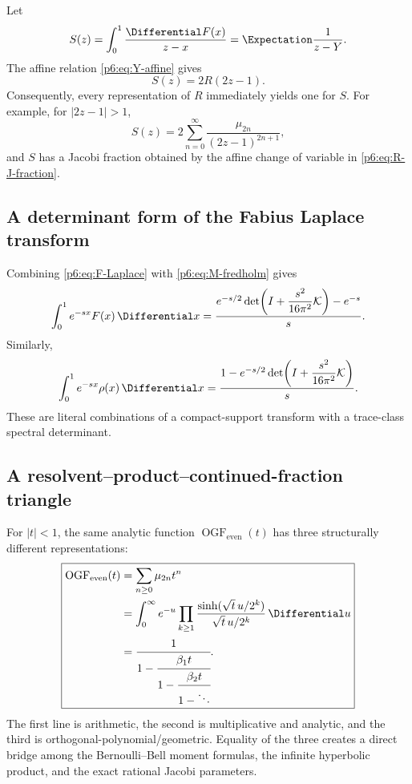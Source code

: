\documentclass[11pt]{article}
\theoremstyle{definition}
\theoremstyle{remark}
\newcommand{\cK}{\mathcal K}
\newcommand{\EvenMomentOrdinaryGeneratingFunction}{\operatorname{OGF}_{\mathrm{even}}}
\begin{document}
Let
\begin{equation}
 S(z)=\int_0^1\frac{\Differential F(x)}{z-x}=\Expectation\frac1{z-Y}.            \label{p6:eq:S-def}
\end{equation}
The affine relation \eqref{p6:eq:Y-affine} gives
\begin{equation}
 \boxed{S(z)=2R(2z-1).}                                     \label{p6:eq:S-R}
\end{equation}
Consequently, every representation of \(R\) immediately yields one for \(S\).  For example,
for \(|2z-1|>1\),
\begin{equation}
 S(z)=2\sum_{n=0}^{\infty}\frac{\mu_{2n}}{(2z-1)^{2n+1}},   \label{p6:eq:S-moment}
\end{equation}
and \(S\) has a Jacobi fraction obtained by the affine change of variable in
\eqref{p6:eq:R-J-fraction}.

\subsection{A determinant form of the Fabius Laplace transform}

Combining \eqref{p6:eq:F-Laplace} with \eqref{p6:eq:M-fredholm} gives
\begin{equation}
 \int_0^1e^{-sx}F(x)\,\Differential x
 =\frac{e^{-s/2}
 \det\!\left(I+\dfrac{s^2}{16\pi^2}\cK\right)-e^{-s}}{s}.  \label{p6:eq:F-Laplace-determinant}
\end{equation}
Similarly,
\begin{equation}
 \int_0^1e^{-sx}\rho(x)\,\Differential x
 =\frac{1-e^{-s/2}
 \det\!\left(I+\dfrac{s^2}{16\pi^2}\cK\right)}{s}.         \label{p6:eq:rho-half-determinant}
\end{equation}
These are literal combinations of a compact-support transform with a trace-class spectral
determinant.

\subsection{A resolvent--product--continued-fraction triangle}

For \(|t|<1\), the same analytic function
\(\EvenMomentOrdinaryGeneratingFunction(t)\) has three structurally different
representations:
\begin{equation}
 \boxed{
 \begin{aligned}
 \EvenMomentOrdinaryGeneratingFunction(t)
 &=\sum_{n\ge0}\mu_{2n}t^n\\
 &=\int_0^{\infty}e^{-u}
   \prod_{k\ge1}\frac{\sinh(\sqrt t\,u/2^k)}{\sqrt t\,u/2^k}\,\Differential u\\
 &=\cfrac{1}{1-\cfrac{\beta_1t}{1-\cfrac{\beta_2t}{1-\ddots}}}.
 \end{aligned}
 }                                                           \label{p6:eq:triangle}
\end{equation}
The first line is arithmetic, the second is multiplicative and analytic, and the third is
orthogonal-polynomial/geometric.  Equality of the three creates a direct bridge among the
Bernoulli--Bell moment formulas, the infinite hyperbolic product, and the exact rational
Jacobi parameters.
\end{document}

